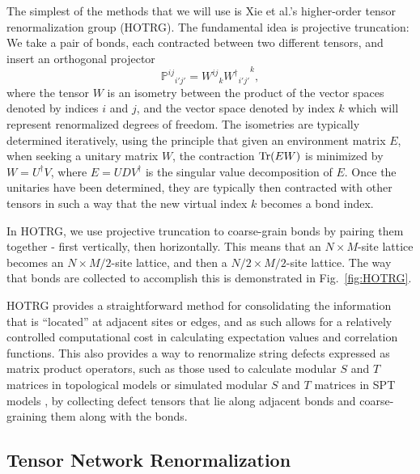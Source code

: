\documentclass[aps,prb,letterpaper,superscriptaddress,twocolumn,showpacs,floatfix,10pt]{revtex4-1}
\begin{document}
The simplest of the methods that we will use is
Xie et al.'s higher-order tensor renormalization group 
\cite{Xiang_HOTRG_2012} (HOTRG). The fundamental
idea is projective truncation: We take a pair of bonds, each contracted between
two different tensors, and insert an orthogonal projector
\begin{equation}
{\mathbb{P}^{ij}}_{i'j'} = {W^{ij}}_k{{W^\dagger}_{i'j'}}^k,
\end{equation}
where the tensor $W$ is an isometry between the product of the vector spaces
denoted by indices $i$ and $j$, and the vector space denoted by index $k$ which
will represent renormalized degrees of freedom. The
isometries are typically determined iteratively, using the principle that
given an environment matrix $E$, when seeking a unitary matrix $W$, the
contraction $\operatorname{Tr}(EW)$ is minimized by $W = U^\dagger V$, where 
$E = UDV^\dagger$ is the singular value decomposition of $E$.
Once the unitaries have been
determined, they are typically then contracted with other tensors in such a
way that the new virtual index $k$ becomes a bond index.

In HOTRG, we use projective truncation to coarse-grain bonds by pairing
them together - first vertically, then horizontally. This means that an
$N\times M$-site lattice becomes an $N\times M/2$-site lattice, and then
a $N/2\times M/2$-site lattice. The way that bonds are collected to accomplish
this is demonstrated in Fig.~\ref{fig:HOTRG}.

HOTRG provides a straightforward method for consolidating the information that
is ``located'' at adjacent sites or edges, and as such allows for a relatively
controlled computational cost in calculating expectation values and
correlation functions.  This also provides a way to renormalize string defects
expressed as matrix product operators,
such as those used to calculate modular $S$ and $T$ matrices in topological
models \cite{HeST} or simulated modular $S$ and $T$ matrices in
SPT models \cite{tnST}, by collecting defect tensors that lie along adjacent
bonds and coarse-graining them along with the bonds.

\subsection{Tensor Network Renormalization}
\label{sec:TNR}
\end{document}
